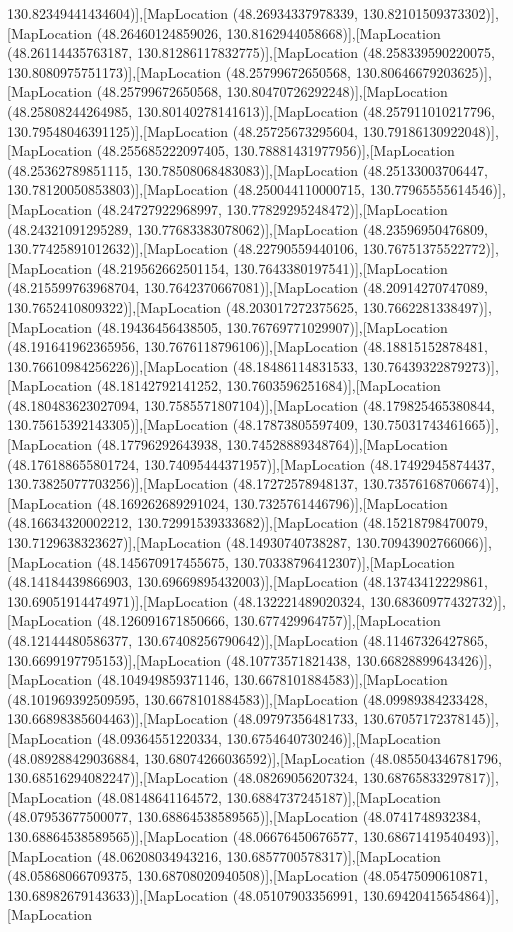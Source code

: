 130.82349441434604)],[MapLocation (48.26934337978339, 130.82101509373302)],[MapLocation (48.26460124859026, 130.8162944058668)],[MapLocation (48.26114435763187, 130.81286117832775)],[MapLocation (48.258339590220075, 130.8080975751173)],[MapLocation (48.25799672650568, 130.80646679203625)],[MapLocation (48.25799672650568, 130.80470726292248)],[MapLocation (48.25808244264985, 130.80140278141613)],[MapLocation (48.257911010217796, 130.79548046391125)],[MapLocation (48.25725673295604, 130.79186130922048)],[MapLocation (48.255685222097405, 130.78881431977956)],[MapLocation (48.25362789851115, 130.78508068483083)],[MapLocation (48.25133003706447, 130.78120050853803)],[MapLocation (48.250044110000715, 130.77965555614546)],[MapLocation (48.24727922968997, 130.77829295248472)],[MapLocation (48.24321091295289, 130.77683383078062)],[MapLocation (48.23596950476809, 130.77425891012632)],[MapLocation (48.22790559440106, 130.76751375522772)],[MapLocation (48.219562662501154, 130.7643380197541)],[MapLocation (48.215599763968704, 130.7642370667081)],[MapLocation (48.20914270747089, 130.7652410809322)],[MapLocation (48.203017272375625, 130.7662281338497)],[MapLocation (48.19436456438505, 130.76769771029907)],[MapLocation (48.191641962365956, 130.7676118796106)],[MapLocation (48.18815152878481, 130.76610984256226)],[MapLocation (48.18486114831533, 130.76439322879273)],[MapLocation (48.18142792141252, 130.7603596251684)],[MapLocation (48.180483623027094, 130.7585571807104)],[MapLocation (48.179825465380844, 130.75615392143305)],[MapLocation (48.17873805597409, 130.75031743461665)],[MapLocation (48.17796292643938, 130.74528889348764)],[MapLocation (48.176188655801724, 130.74095444371957)],[MapLocation (48.17492945874437, 130.73825077703256)],[MapLocation (48.17272578948137, 130.73576168706674)],[MapLocation (48.169262689291024, 130.7325761446796)],[MapLocation (48.16634320002212, 130.72991539333682)],[MapLocation (48.15218798470079, 130.7129638323627)],[MapLocation (48.14930740738287, 130.70943902766066)],[MapLocation (48.145670917455675, 130.70338796412307)],[MapLocation (48.14184439866903, 130.69669895432003)],[MapLocation (48.13743412229861, 130.69051914474971)],[MapLocation (48.132221489020324, 130.68360977432732)],[MapLocation (48.126091671850666, 130.677429964757)],[MapLocation (48.12144480586377, 130.67408256790642)],[MapLocation (48.11467326427865, 130.6699197795153)],[MapLocation (48.10773571821438, 130.66828899643426)],[MapLocation (48.104949859371146, 130.6678101884583)],[MapLocation (48.101969392509595, 130.6678101884583)],[MapLocation (48.09989384233428, 130.66898385604463)],[MapLocation (48.09797356481733, 130.67057172378145)],[MapLocation (48.09364551220334, 130.6754640730246)],[MapLocation (48.089288429036884, 130.68074266036592)],[MapLocation (48.085504346781796, 130.68516294082247)],[MapLocation (48.08269056207324, 130.68765833297817)],[MapLocation (48.08148641164572, 130.6884737245187)],[MapLocation (48.07953677500077, 130.68864538589565)],[MapLocation (48.0741748932384, 130.68864538589565)],[MapLocation (48.06676450676577, 130.68671419540493)],[MapLocation (48.06208034943216, 130.6857700578317)],[MapLocation (48.05868066709375, 130.68708020940508)],[MapLocation (48.05475090610871, 130.68982679143633)],[MapLocation (48.05107903356991, 130.69420415654864)],[MapLocation 